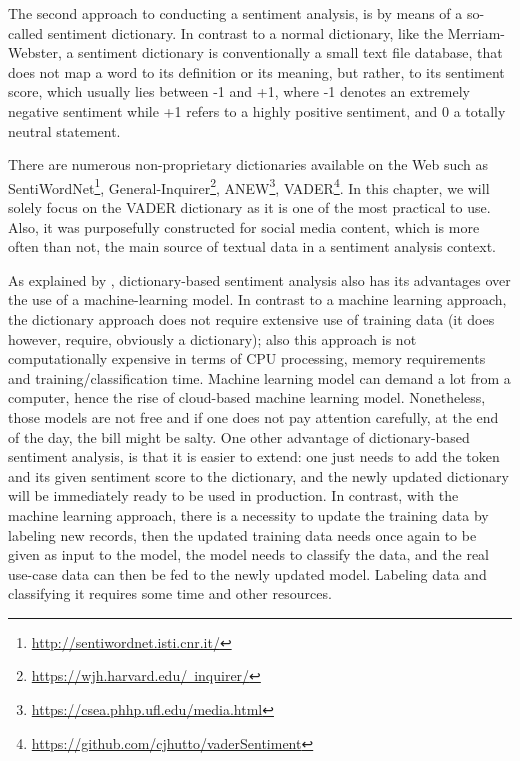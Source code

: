 	The second approach to conducting a sentiment analysis, is by means of a so-called sentiment dictionary. In contrast to a normal dictionary, like the Merriam-Webster, a sentiment dictionary is conventionally a small text file database, that does not map a word to its definition or its meaning, but rather, to its sentiment score, which usually lies between -1 and +1, where -1 denotes an extremely negative sentiment while +1 refers to a highly positive sentiment, and 0 a totally neutral statement.

	There are numerous non-proprietary dictionaries available on the Web such as SentiWordNet\footnote{\href{http://sentiwordnet.isti.cnr.it}{http://sentiwordnet.isti.cnr.it/}}, General-Inquirer\footnote{\href{https://wjh.harvard.edu/~inquirer/}{https://wjh.harvard.edu/~inquirer/}}, ANEW\footnote{\href{https://csea.phhp.ufl.edu/media.html}{https://csea.phhp.ufl.edu/media.html}}, VADER\footnote{\href{https://github.com/cjhutto/vaderSentiment}{https://github.com/cjhutto/vaderSentiment}}. In this chapter, we will solely focus on the VADER dictionary as it is one of the most practical to use. Also, it was purposefully constructed for social media content, which is more often than not, the main source of textual data in a sentiment analysis context.

	As explained by \cite{hutto_vader_2014}, dictionary-based sentiment analysis also has its advantages over the use of a machine-learning model. In contrast to a machine learning approach, the dictionary approach does not require extensive use of training data (it does however, require, obviously a dictionary); also this approach is not computationally expensive in terms of CPU processing, memory requirements and training/classification time. Machine learning model can demand a lot from a computer, hence the rise of cloud-based machine learning model. Nonetheless, those models are not free and if one does not pay attention carefully, at the end of the day, the bill might be salty. One other advantage of dictionary-based sentiment analysis, is that it is easier to extend: one just needs to add the token and its given sentiment score to the dictionary, and the newly updated dictionary will be immediately ready to be used in production. In contrast, with the machine learning approach, there is a necessity to update the training data by labeling new records, then the updated training data needs once again to be given as input to the model, the model needs to classify the data, and the real use-case data can then be fed to the newly updated model. Labeling data and classifying it requires some time and other resources.


